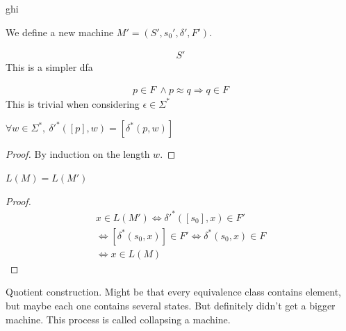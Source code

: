 \documentclass[class=scrartcl, crop=false]{standalone}
\begin{document}
\begin{lemma}
  ghi
\end{lemma} 

We define a new machine $M' = (S', s_0', \delta', F')$. 

\begin{gather*}
  S' %
\end{gather*} 
This is a simpler dfa

\begin{lemma}
  \begin{gather*}
    
   p \in F \ \wedge p \approx q \Rightarrow q \in F
  \end{gather*} 
  This is trivial when considering $\epsilon \in \Sigma^*$

\end{lemma} 
\begin{lemma}
  $\forall w \in \Sigma^*, \ \delta'^*([p], w) = [\delta^*(p, w)]$
  \begin{proof}
    By induction on the length $w$.
  \end{proof}
\end{lemma} 

\begin{theorem}
  $L(M) = L(M')$
  \begin{proof}
    \begin{gather*}
      x \in L(M') \Leftrightarrow \delta'^*([s_0], x) \in F' \\
      \Leftrightarrow [\delta^*(s_0, x)] \in F' \Leftrightarrow \delta^*(s_0, x) \in F \\
      \Leftrightarrow x \in L(M)
    \end{gather*} 
  \end{proof} 
  Quotient construction. Might be that every equivalence class contains element, but maybe each one contains several states. But definitely didn't get a bigger machine. This process is called collapsing a machine.
\end{theorem} 
\end{document}
